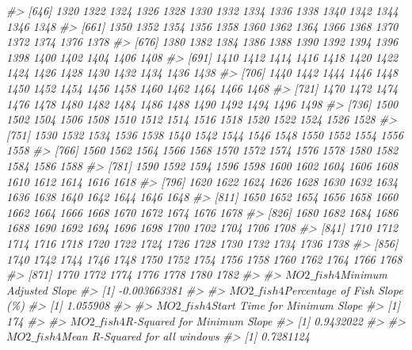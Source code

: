 \documentclass[
]{article}
\newenvironment{Shaded}{\begin{snugshade}}{\end{snugshade}}
\newcommand{\CommentTok}[1]{\textcolor[rgb]{0.56,0.35,0.01}{\textit{#1}}}
\begin{document}
\begin{Shaded}
\begin{Highlighting}[]
\CommentTok{\#\textgreater{} [646] 1320 1322 1324 1326 1328 1330 1332 1334 1336 1338 1340 1342 1344 1346 1348}
\CommentTok{\#\textgreater{} [661] 1350 1352 1354 1356 1358 1360 1362 1364 1366 1368 1370 1372 1374 1376 1378}
\CommentTok{\#\textgreater{} [676] 1380 1382 1384 1386 1388 1390 1392 1394 1396 1398 1400 1402 1404 1406 1408}
\CommentTok{\#\textgreater{} [691] 1410 1412 1414 1416 1418 1420 1422 1424 1426 1428 1430 1432 1434 1436 1438}
\CommentTok{\#\textgreater{} [706] 1440 1442 1444 1446 1448 1450 1452 1454 1456 1458 1460 1462 1464 1466 1468}
\CommentTok{\#\textgreater{} [721] 1470 1472 1474 1476 1478 1480 1482 1484 1486 1488 1490 1492 1494 1496 1498}
\CommentTok{\#\textgreater{} [736] 1500 1502 1504 1506 1508 1510 1512 1514 1516 1518 1520 1522 1524 1526 1528}
\CommentTok{\#\textgreater{} [751] 1530 1532 1534 1536 1538 1540 1542 1544 1546 1548 1550 1552 1554 1556 1558}
\CommentTok{\#\textgreater{} [766] 1560 1562 1564 1566 1568 1570 1572 1574 1576 1578 1580 1582 1584 1586 1588}
\CommentTok{\#\textgreater{} [781] 1590 1592 1594 1596 1598 1600 1602 1604 1606 1608 1610 1612 1614 1616 1618}
\CommentTok{\#\textgreater{} [796] 1620 1622 1624 1626 1628 1630 1632 1634 1636 1638 1640 1642 1644 1646 1648}
\CommentTok{\#\textgreater{} [811] 1650 1652 1654 1656 1658 1660 1662 1664 1666 1668 1670 1672 1674 1676 1678}
\CommentTok{\#\textgreater{} [826] 1680 1682 1684 1686 1688 1690 1692 1694 1696 1698 1700 1702 1704 1706 1708}
\CommentTok{\#\textgreater{} [841] 1710 1712 1714 1716 1718 1720 1722 1724 1726 1728 1730 1732 1734 1736 1738}
\CommentTok{\#\textgreater{} [856] 1740 1742 1744 1746 1748 1750 1752 1754 1756 1758 1760 1762 1764 1766 1768}
\CommentTok{\#\textgreater{} [871] 1770 1772 1774 1776 1778 1780 1782}
\CommentTok{\#\textgreater{} }
\CommentTok{\#\textgreater{} $MO2\_fish4$\textasciigrave{}Minimum Adjusted Slope\textasciigrave{}}
\CommentTok{\#\textgreater{} [1] {-}0.003663381}
\CommentTok{\#\textgreater{} }
\CommentTok{\#\textgreater{} $MO2\_fish4$\textasciigrave{}Percentage of Fish Slope (\%)\textasciigrave{}}
\CommentTok{\#\textgreater{} [1] 1.055908}
\CommentTok{\#\textgreater{} }
\CommentTok{\#\textgreater{} $MO2\_fish4$\textasciigrave{}Start Time for Minimum Slope\textasciigrave{}}
\CommentTok{\#\textgreater{} [1] 174}
\CommentTok{\#\textgreater{} }
\CommentTok{\#\textgreater{} $MO2\_fish4$\textasciigrave{}R{-}Squared for Minimum Slope\textasciigrave{}}
\CommentTok{\#\textgreater{} [1] 0.9432022}
\CommentTok{\#\textgreater{} }
\CommentTok{\#\textgreater{} $MO2\_fish4$\textasciigrave{}Mean R{-}Squared for all windows\textasciigrave{}}
\CommentTok{\#\textgreater{} [1] 0.7281124}
\end{Highlighting}
\end{Shaded}
\end{document}
